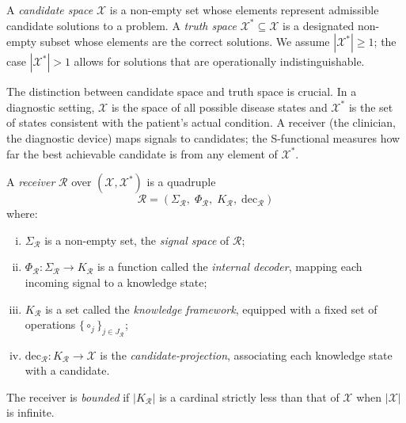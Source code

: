 \begin{definition}
\label{def:candidate-truth}
A \emph{candidate space} $\mathcal{X}$ is a non-empty set whose elements
represent admissible candidate solutions to a problem.  A
\emph{truth space} $\mathcal{X}^{*} \subseteq \mathcal{X}$ is a designated
non-empty subset whose elements are the correct solutions.  We assume
$|\mathcal{X}^{*}| \geq 1$; the case $|\mathcal{X}^{*}| > 1$ allows for
solutions that are operationally indistinguishable.
\end{definition}

\begin{remark}
The distinction between candidate space and truth space is crucial.  In a
diagnostic setting, $\mathcal{X}$ is the space of all possible disease states
and $\mathcal{X}^{*}$ is the set of states consistent with the patient's
actual condition.  A receiver (the clinician, the diagnostic device) maps
signals to candidates; the S-functional measures how far the best achievable
candidate is from any element of $\mathcal{X}^{*}$.
\end{remark}

\begin{definition}
\label{def:receiver-quad}
A \emph{receiver} $\mathcal{R}$ over $(\mathcal{X}, \mathcal{X}^{*})$ is a
quadruple
\[
  \mathcal{R} = (\Sigma_{\mathcal{R}},\; \Phi_{\mathcal{R}},\;
                 K_{\mathcal{R}},\; \mathrm{dec}_{\mathcal{R}})
\]
where:
\begin{enumerate}[(i)]
  \item $\Sigma_{\mathcal{R}}$ is a non-empty set, the
    \emph{signal space} of $\mathcal{R}$;
  \item $\Phi_{\mathcal{R}}: \Sigma_{\mathcal{R}} \to K_{\mathcal{R}}$
    is a function called the \emph{internal decoder}, mapping each incoming
    signal to a knowledge state;
  \item $K_{\mathcal{R}}$ is a set called the \emph{knowledge framework},
    equipped with a fixed set of operations $\{\circ_j\}_{j \in J_{\mathcal{R}}}$;
  \item $\mathrm{dec}_{\mathcal{R}}: K_{\mathcal{R}} \to \mathcal{X}$ is the
    \emph{candidate-projection}, associating each knowledge state with a
    candidate.
\end{enumerate}
The receiver is \emph{bounded} if $|K_{\mathcal{R}}|$ is a cardinal strictly
less than that of $\mathcal{X}$ when $|\mathcal{X}|$ is infinite.
\end{definition}

